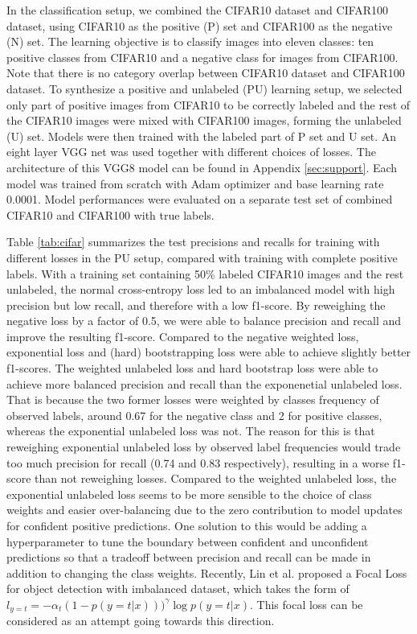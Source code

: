 In the classification setup, we combined the CIFAR10 dataset and CIFAR100 dataset, using CIFAR10 as the positive (P) set and CIFAR100 as the negative (N) set.
The learning objective is to classify images into eleven classes: ten positive classes from CIFAR10 and a negative class for images from CIFAR100.
Note that there is no category overlap between CIFAR10 dataset and CIFAR100 dataset.
To synthesize a positive and unlabeled (PU) learning setup, we selected only part of positive images from CIFAR10 to be correctly labeled and the rest of the CIFAR10 images were mixed with CIFAR100 images, forming the unlabeled (U) set.
Models were then trained with the labeled part of P set and U set.
An eight layer VGG net was used together with different choices of losses.
The architecture of this VGG8 model can be found in Appendix \ref{sec:support}.
Each model was trained from scratch with Adam optimizer and base learning rate 0.0001.
Model performances were evaluated on a separate test set of combined CIFAR10 and CIFAR100 with true labels.

Table \ref{tab:cifar} summarizes the test precisions and recalls for training with different losses in the PU setup, compared with training with complete positive labels.
With a training set containing 50\% labeled CIFAR10 images and the rest unlabeled, the normal cross-entropy loss led to an imbalanced model with high precision but low recall, and therefore with a low f1-score.
By reweighing the negative loss by a factor of 0.5, we were able to balance precision and recall and improve the resulting f1-score.
Compared to the negative weighted loss, exponential loss and (hard) bootstrapping loss were able to achieve slightly better f1-scores.
The weighted unlabeled loss and hard bootstrap loss were able to achieve more balanced precision and recall than the exponenetial unlabeled loss.
That is because the two former losses were weighted by classes frequency of observed labels, around 0.67 for the negative class and 2 for positive classes, whereas the exponential unlabeled loss was not.
The reason for this is that reweighing exponential unlabeled loss by observed label frequencies would trade too much precision for recall (0.74 and 0.83 respectively), resulting in a worse f1-score than not reweighing losses.
Compared to the weighted unlabeled loss, the exponential unlabeled loss seems to be more sensible to the choice of class weights and easier over-balancing due to the zero contribution to model updates for confident positive predictions.
One solution to this would be adding a hyperparameter to tune the boundary between confident and unconfident predictions so that a tradeoff between precision and recall can be made in addition to changing the class weights.
Recently, Lin et al. \cite{lin2017focal} proposed a Focal Loss\cite{lin2017focal} for object detection with imbalanced dataset, which takes the form of $l_{y=t} = - \alpha_t (1-p(y=t \vert x)))^{\gamma} \log p(y=t \vert x)$.
This focal loss can be considered as an attempt going towards this direction.


